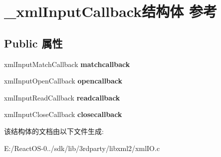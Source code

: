 \hypertarget{struct__xml_input_callback}{}\section{\+\_\+xml\+Input\+Callback结构体 参考}
\label{struct__xml_input_callback}
\subsection*{Public 属性}
\begin{DoxyCompactItemize}
\item 
\mbox{\label{struct__xml_input_callback_a96b605c2612fe41dfbb1792477c36ed0}} 
xml\+Input\+Match\+Callback {\bfseries matchcallback}
\item 
\mbox{\label{struct__xml_input_callback_af9bc5e46ce910da957db4ad94bd2c4ba}} 
xml\+Input\+Open\+Callback {\bfseries opencallback}
\item 
\mbox{\label{struct__xml_input_callback_a70cbb71d862fd2c87cbced963b9a9505}} 
xml\+Input\+Read\+Callback {\bfseries readcallback}
\item 
\mbox{\label{struct__xml_input_callback_a70f45e9e8435e21100495c444c3e7fe7}} 
xml\+Input\+Close\+Callback {\bfseries closecallback}
\end{DoxyCompactItemize}


该结构体的文档由以下文件生成\+:\begin{DoxyCompactItemize}
\item 
E\+:/\+React\+O\+S-\/0../sdk/lib/3rdparty/libxml2/xml\+I\+O.\+c\end{DoxyCompactItemize}
